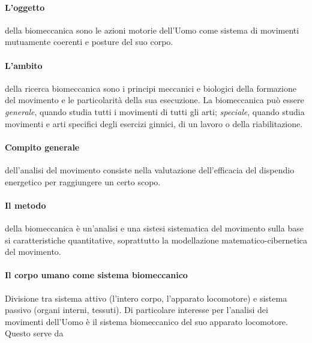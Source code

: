 \paragraph {L'oggetto} della biomeccanica sono le azioni motorie dell'Uomo come sistema
di movimenti mutuamente coerenti e posture del suo corpo.

\paragraph {L'ambito} della ricerca biomeccanica sono i principi meccanici e biologici
della formazione del movimento e le particolarit\`a della sua esecuzione.
La biomeccanica pu\`o essere \emph {generale}, quando studia tutti i movimenti di tutti gli arti;
\emph {speciale}, quando studia movimenti e arti specifici degli esercizi ginnici,
di un lavoro o della riabilitazione.

\paragraph {Compito generale} dell'analisi del movimento consiste nella valutazione
dell'efficacia del dispendio energetico per raggiungere un certo scopo.

% 
\paragraph {Il metodo} della biomeccanica \`e un'analisi e una sistesi sistematica
del movimento sulla base si caratteristiche quantitative,
soprattutto la modellazione matematico-cibernetica del movimento.

\paragraph {Il corpo umano come sistema biomeccanico}
Divisione tra sistema attivo (l'intero corpo, l'apparato locomotore)
e sistema passivo (organi interni, tessuti).
Di particolare interesse per l'analisi dei movimenti dell'Uomo
\`e il sistema biomeccanico del suo apparato locomotore.
Questo serve da

